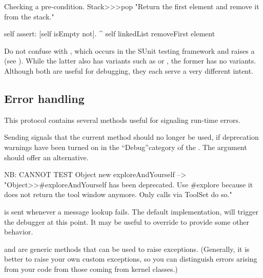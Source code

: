 \documentclass[a4paper,10pt,twoside]{book}
\begin{document}
\begin{method}{Checking a pre-condition.}
Stack>>>pop
    "Return the first element and remove it from the stack."

    self assert: [self isEmpty not].
    ^ self linkedList removeFirst element
\end{method}

Do not confuse  with , which occurs in the SUnit testing framework and raises a  (see ).
While the latter also has variants such as  or , the former has no variants.
Although both are useful for debugging, they each serve a very different intent.

\subsection{Error handling}

This protocol contains several methods useful for signaling run-time errors.

Sending  signals that the current method should no longer be used, if deprecation warnings have been turned on in the ``Debug''category of the .
The  argument should offer an alternative.

\begin{code}{NB: CANNOT TEST}
Object new exploreAndYourself --> "Object>>#exploreAndYourself has been deprecated. Use #explore because it does not return the tool window anymore. Only calls via ToolSet do so."
\end{code}

 is sent whenever a message lookup fails.
The default implementation, \ie {} will trigger the debugger at this point.
It may be useful to override  to provide some other behavior.


 and  are generic methods that can be used to raise exceptions.
(Generally, it is better to raise your own custom exceptions, so you can distinguish errors arising from your code from those coming from kernel classes.)
\end{document}

